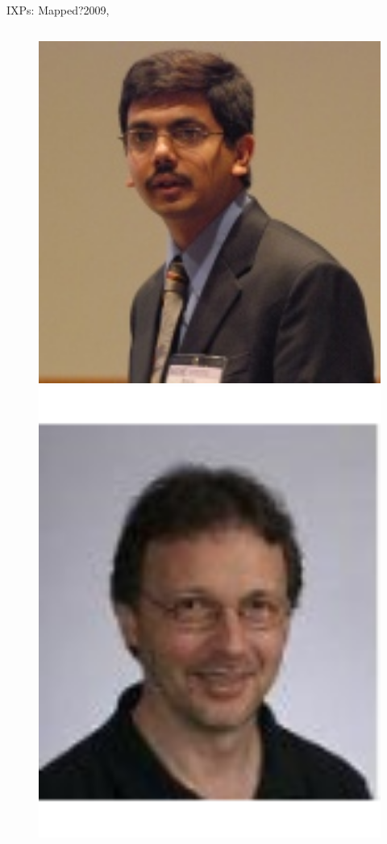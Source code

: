 \documentclass[ngerman,compress,hyperref={bookmarks}]{beamer}
\begin{document}
\begin{frame}{IXPs: Mapped?}{2009, \cite{Augustin:2009:IM:1644893.1644934}}
\begin{columns}[c]
\begin{column}{0.1\textwidth}
\begin{figure}
        \includegraphics[width=1\textwidth]{images/krishnamurthy_b}\\
        \includegraphics[width=1\textwidth]{images/willinger_w}

\end{figure}
\end{column}
\end{columns}
\end{frame}
\end{document}

